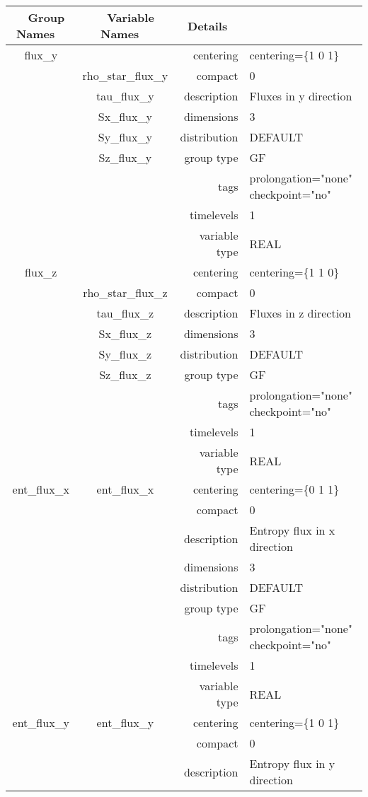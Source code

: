 \documentclass{article}
\begin{document}
\begin{tabular*}{150mm}{|c|c@{\extracolsep{\fill}}|rl|} \hline 
~ {\bf Group Names} ~ & ~ {\bf Variable Names} ~  &{\bf Details} ~ & ~ \\ 
\hline 
flux\_y &  & centering & centering=\{1 0 1\} \\ 
 & rho\_star\_flux\_y & compact & 0 \\ 
 & tau\_flux\_y & description & Fluxes in y direction \\ 
 & Sx\_flux\_y & dimensions & 3 \\ 
 & Sy\_flux\_y & distribution & DEFAULT \\ 
 & Sz\_flux\_y & group type & GF \\ 
 &  & tags & prolongation="none" checkpoint="no" \\ 
 &  & timelevels & 1 \\ 
 &  & variable type & REAL \\ 
\hline 
flux\_z &  & centering & centering=\{1 1 0\} \\ 
 & rho\_star\_flux\_z & compact & 0 \\ 
 & tau\_flux\_z & description & Fluxes in z direction \\ 
 & Sx\_flux\_z & dimensions & 3 \\ 
 & Sy\_flux\_z & distribution & DEFAULT \\ 
 & Sz\_flux\_z & group type & GF \\ 
 &  & tags & prolongation="none" checkpoint="no" \\ 
 &  & timelevels & 1 \\ 
 &  & variable type & REAL \\ 
\hline 
ent\_flux\_x & ent\_flux\_x & centering & centering=\{0 1 1\} \\ 
 &  & compact & 0 \\ 
 &  & description & Entropy flux in x direction \\ 
 &  & dimensions & 3 \\ 
 &  & distribution & DEFAULT \\ 
 &  & group type & GF \\ 
 &  & tags & prolongation="none" checkpoint="no" \\ 
 &  & timelevels & 1 \\ 
 &  & variable type & REAL \\ 
\hline 
ent\_flux\_y & ent\_flux\_y & centering & centering=\{1 0 1\} \\ 
 &  & compact & 0 \\ 
 &  & description & Entropy flux in y direction \\ 

\end{tabular*}
\end{document}
